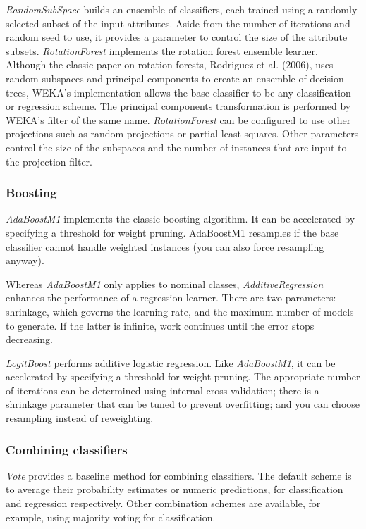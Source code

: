 \textit{RandomSubSpace} builds an ensemble of classifiers, each
trained using a randomly selected subset of the input
attributes. Aside from the number of iterations and random seed to
use, it provides a parameter to control the size of the attribute
subsets. \textit{RotationForest} implements the rotation forest
ensemble learner. Although the classic paper on rotation forests,
Rodriguez et al. (2006), uses random subspaces and principal
components to create an ensemble of decision trees, WEKA's
implementation allows the base classifier to be any classification or
regression scheme. The principal components transformation is
performed by WEKA's filter of the same name. \textit{RotationForest}
can be configured to use other projections such as random projections
or partial least squares. Other parameters control the size of the
subspaces and the number of instances that are input to the projection
filter.

\subsubsection{Boosting}

\textit{AdaBoostM1} implements the classic boosting algorithm. It can
be accelerated by specifying a threshold for weight
pruning. AdaBoostM1 resamples if the base classifier cannot handle
weighted instances (you can also force resampling anyway).

Whereas \textit{AdaBoostM1} only applies to nominal classes,
\textit{AdditiveRegression} enhances the performance of a regression
learner. There are two parameters: shrinkage, which governs the
learning rate, and the maximum number of models to generate. If the
latter is infinite, work continues until the error stops decreasing.

\textit{LogitBoost} performs additive logistic regression. Like
\textit{AdaBoostM1}, it can be accelerated by specifying a threshold
for weight pruning. The appropriate number of iterations can be
determined using internal cross-validation; there is a shrinkage
parameter that can be tuned to prevent overfitting; and you can choose
resampling instead of reweighting.

\subsubsection{Combining classifiers}

\textit{Vote} provides a baseline method for combining
classifiers. The default scheme is to average their probability
estimates or numeric predictions, for classification and regression
respectively. Other combination schemes are available, for example,
using majority voting for classification.

